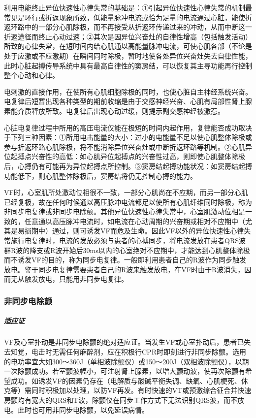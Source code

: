 利用电能终止异位快速性心律失常的基础是：①引起异位快速性心律失常的机制最常见是环行或折返现象所致，低能量脉冲电流或恰为足量的电流通过心脏，能使折返环路中的一部分心肌除极，而不再接受从折返环传递过来的冲动，从而中断这一折返途径而终止心动过速；②其次是因异位兴奋灶的自律性增高（包括触发活动）所致的心律失常，在短时间内给心肌通以高能量脉冲电流，可使心肌各部（不论是处于应激或不应激期）在瞬间同时除极，暂时地使各处异位兴奋灶失去自律性能，此时心脏起搏传导系统中具有最高自律性的窦房结，可以恢复其主导功能再行控制整个心动和心律。

电刺激的直接作用，在使所有心肌细胞除极的同时，也使心脏自主神经系统兴奋。电复律后短暂出现各种类型的期前收缩是由于交感神经兴奋、心肌有局部性肾上腺素能介质释放所致。电复律后出现心动过缓，则提示副交感神经被激惹。

心脏电复律过程中所用的高压电流仅能在极短的时间内起作用，复律能否成功取决于下列三种因素：①所用电击能量的大小：过小的电能量不足以使心肌整体除极或参与折返环路心肌除极，将不能消除异位兴奋灶或中断折返环路等机制。②心肌异位起搏点兴奋性的高低：如心肌异位起搏点的兴奋性过高，则即使心肌整体除极后，心搏仍有可能再为异位起搏点所控制。③窦房结起搏功能状况：如窦房结起搏功能低下，则心肌整体除极后，窦房结将仍无控制心搏的能力。

VF时，心室肌所处激动位相很不一致，一部分心肌尚在不应期，而另一部分心肌已经复极，故在任何时候通以高压脉冲电流都足以使所有心肌纤维同时除极，称为非同步电复律或非同步电除颤。其他异位快速性心律失常中，心室肌激动位相是一致的，任意通以高压脉冲电流时，如电流在心动周期的兴奋期或相对不应期中（尤其是易损期中）通过，则可诱发VF而危及生命。因此VF以外的异位快速性心律失常施行电复律时，电流的发放必须与患者的心搏同步，将电流发放在患者QRS波群R波的降支或R波开始后30ms以内的心室绝对不应期中，才能达到心肌整体除极而不诱发VF的目的，称为同步电复律。一般即利用患者自己的R波作为同步触发放电。鉴于同步电复律需要患者自己的R波来触发放电，在VF时由于R波消失，因而无从触发放电，只能用非同步电复律。

\subsubsection{非同步电除颤}

\subparagraph{适应证}

VF及心室扑动是非同步电除颤的绝对适应证。当发生VF或心室扑动后，患者已失去知觉，电击时无需任何麻醉剂，应在积极行CPR时即刻进行非同步除颤。选用的电功率宜大如300～360J（单相波除颤仪）或150～200J（双相波除颤仪），以期一次除颤成功。若室颤波幅小，可注射肾上腺素，以增大颤动波，使再次除颤有希望成功。如诱发VF的因素仍存在（电解质与酸碱平衡失调、缺氧、心肌梗死、休克等）需同时积极加以处理，以防VF再发。有时快速的VT或预激综合征合并快速房颤均有宽大的QRS和T波，除颤仪在同步工作方式下无法识别QRS波，而不放电。此时也可用非同步电除颤，以免延误病情。

